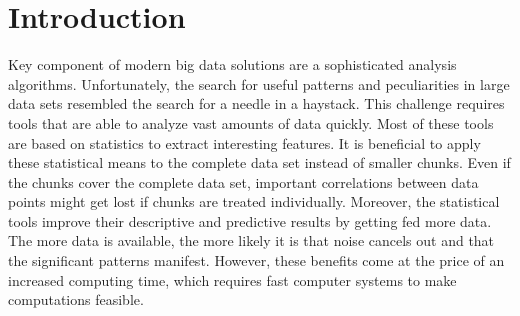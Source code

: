 \section{Introduction}

Key component of modern big data solutions are a sophisticated analysis algorithms.%
Unfortunately, the search for useful patterns and peculiarities in large data sets resembled the search for a needle in a haystack. This challenge requires tools that are able to analyze vast amounts of data quickly. Most of these tools are based on statistics to extract interesting features. It is beneficial to apply these statistical means to the complete data set instead of smaller chunks. Even if the chunks cover the complete data set, important correlations between data points might get lost if chunks are treated individually. Moreover, the statistical tools improve their descriptive and predictive results by getting fed more data. The more data is available, the more likely it is that noise cancels out and that the significant patterns manifest. However, these benefits come at the price of an increased computing time, which requires fast computer systems to make computations feasible. 
